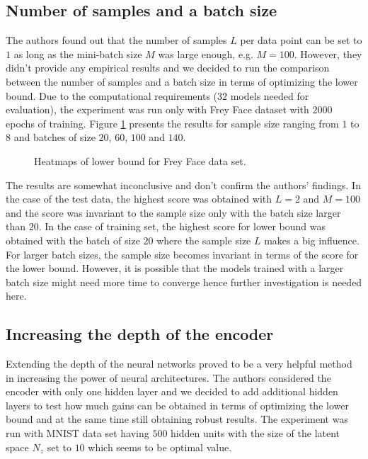 \documentclass[../report.tex]{subfiles}
\begin{document}
\subsection{Number of samples and a batch size}
The authors found out that the number of samples $L$ per data point can be set to $1$ as long as the mini-batch size $M$ was large enough, e.g. $M = 100$. However, they didn't provide any empirical results and we decided to run the comparison between the number of samples and a batch size in terms of optimizing the lower bound. Due to the computational requirements ($32$ models needed for evaluation), the experiment was run only with Frey Face dataset with $2000$ epochs of training. Figure \ref{fig:heatmaps} presents the results for sample size ranging from $1$ to $8$ and batches of size $20$, $60$, $100$ and $140$.
\begin{figure}[!htb]
%
\endminipage 
{}  
\endminipage\hfill
  \caption[1]{Heatmaps of lower bound for Frey Face data set.}
  \label{fig:heatmaps}
\end{figure}

The results are somewhat inconclusive and don't confirm the authors' findings. In the case of the test data, the highest score was obtained with $L=2$ and $M=100$ and the score was invariant to the sample size only with the batch size larger than $20$. In the case of training set, the highest score for lower bound was obtained with the batch of size $20$ where the sample size $L$ makes a big influence. For larger batch sizes, the sample size becomes invariant in terms of the score for the lower bound. However, it is possible that the models trained with a larger batch size might need more time to converge hence further investigation is needed here.

\subsection{Increasing the depth of the encoder}
Extending the depth of the neural networks proved to be a very helpful method in increasing the power of neural architectures. The authors considered the encoder with only one hidden layer and we decided to add additional hidden layers to test how much gains can be obtained in terms of optimizing the lower bound and at the same time still obtaining robust results. The experiment was run with MNIST data set having $500$ hidden units with the size of the latent space $N_z$ set to $10$ which seems to be optimal value. 
\end{document}
